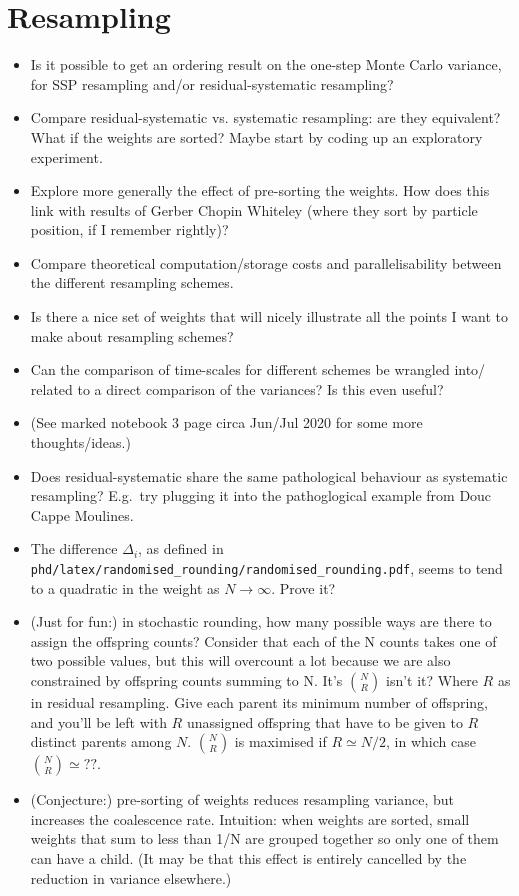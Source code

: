 \documentclass{article}
\begin{document}
\section*{Resampling}
\begin{itemize}
\item Is it possible to get an ordering result on the one-step Monte Carlo variance, for SSP resampling and/or residual-systematic resampling?
\item Compare residual-systematic vs. systematic resampling: are they equivalent? What if the weights are sorted? Maybe start by coding up an exploratory experiment.
\item Explore more generally the effect of pre-sorting the weights. How does this link with results of Gerber Chopin Whiteley (where they sort by particle position, if I remember rightly)?
\item Compare theoretical computation/storage costs and parallelisability between the different resampling schemes.
\item Is there a nice set of weights that will nicely illustrate all the points I want to make about resampling schemes?
\item Can the comparison of time-scales for different schemes be wrangled into/ related to a direct comparison of the variances? Is this even useful?
\item (See marked notebook 3 page circa Jun/Jul 2020 for some more thoughts/ideas.)
\item Does residual-systematic share the same pathological behaviour as systematic resampling? E.g.\ try plugging it into the pathoglogical example from Douc Cappe Moulines.
\item The difference $\Delta_i$, as defined in \texttt{phd/latex/randomised\_rounding/randomised\_rounding.pdf}, seems to tend to a quadratic in the weight as $N\to\infty$. Prove it?
\item (Just for fun:) in stochastic rounding, how many possible ways are there to assign the offspring counts? Consider that each of the N counts takes one of two possible values, but this will overcount a lot because we are also constrained by offspring counts summing to N. It's $\binom{N}{R}$ isn't it? Where $R$ as in residual resampling. Give each parent its minimum number of offspring, and you'll be left with $R$ unassigned offspring that have to be given to $R$ distinct parents among $N$. $\binom{N}{R}$ is maximised if $R\simeq N/2$, in which case $\binom{N}{R}\simeq ??$.
\item (Conjecture:) pre-sorting of weights reduces resampling variance, but increases the coalescence rate. Intuition: when weights are sorted, small weights that sum to less than 1/N are grouped together so only one of them can have a child. (It may be that this effect is entirely cancelled by the reduction in variance elsewhere.)
\end{itemize}
\end{document}
